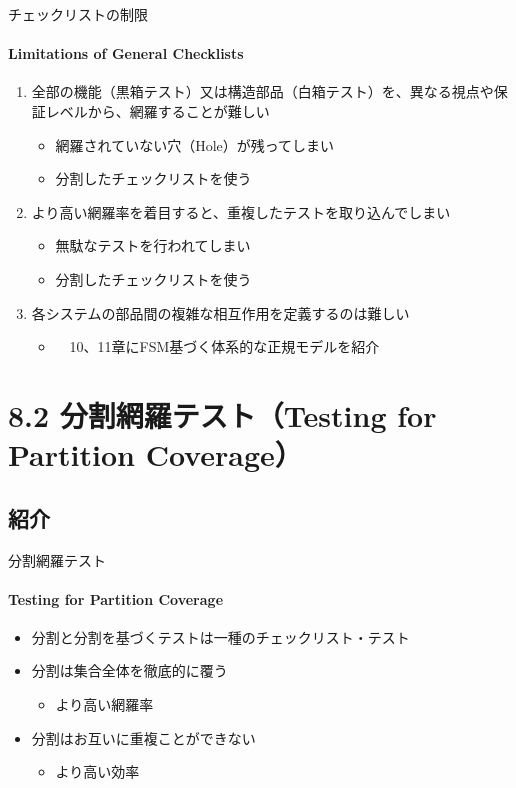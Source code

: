 \begin{frame}{チェックリストの制限}
\framesubtitle{Limitations of General Checklists}
\begin{enumerate}
\item 全部の機能（黒箱テスト）又は構造部品（白箱テスト）を、異なる視点や保証レベルから、網羅することが難しい
    \begin{itemize}
    \item 網羅されていない穴（Hole）が残ってしまい
    \item<uncover@3-|alert@3> 分割したチェックリストを使う
    \end{itemize}
\item より高い網羅率を着目すると、重複したテストを取り込んでしまい
    \begin{itemize}
    \item 無駄なテストを行われてしまい
    \item<uncover@3-|alert@3> 分割したチェックリストを使う
    \end{itemize}
\item 各システムの部品間の複雑な相互作用を定義するのは難しい
    \begin{itemize}
    \item<uncover@2-|alert@2>　10、11章にFSM基づく体系的な正規モデルを紹介
     
    \end{itemize}
\end{enumerate}
\end{frame}
\section{8.2 分割網羅テスト（Testing for Partition Coverage）}
\subsection{紹介}
\begin{frame}{分割網羅テスト}
\framesubtitle{Testing for Partition Coverage}
\begin{itemize}
\item 分割と分割を基づくテストは一種のチェックリスト・テスト
\item 分割は集合全体を徹底的に覆う　 
    \begin{itemize}
    \item より高い\alert{網羅率}
    \end{itemize}
\item 分割はお互いに重複ことができない
    \begin{itemize}
    \item より高い\alert{効率}
    \end{itemize}
\end{itemize}
\end{frame}

